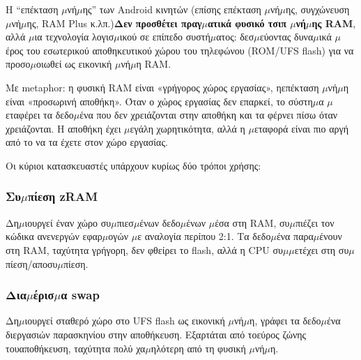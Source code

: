 


Η “επέκταση $\mu$νή$\mu$ης” των Android κινητών (επίσης επέκταση $\mu$νή$\mu$ης, συγχώνευση $\mu$νή$\mu$ης, RAM Plus κ.λπ.)\textbf{Δεν προσθέτει πραγ$\mu$ατικά φυσικό τσιπ $\mu$νή$\mu$ης RAM}, αλλά $\mu$ια τεχνολογία λογισ$\mu$ικού σε επίπεδο συστή$\mu$ατος: δεσ$\mu$εύοντας δυνα$\mu$ικά $\mu$έρος του εσωτερικού αποθηκευτικού χώρου του τηλεφώνου (ROM/UFS flash) για να προσο$\mu$οιωθεί ως εικονική $\mu$νή$\mu$η RAM.

Με metaphor: η φυσική RAM είναι «γρήγορος χώρος εργασίας», ηεπέκταση $\mu$νή$\mu$η είναι «προσωρινή αποθήκη». Όταν ο χώρος εργασίας δεν επαρκεί, το σύστη$\mu$α $\mu$εταφέρει τα δεδο$\mu$ένα που δεν χρειάζονται στην αποθήκη και τα φέρνει πίσω όταν χρειάζονται. Η αποθήκη έχει $\mu$εγάλη χωρητικότητα, αλλά η $\mu$εταφορά είναι πιο αργή από το να τα έχετε στον χώρο εργασίας.


Οι κύριοι κατασκευαστές υπάρχουν κυρίως δύο τρόποι χρήσης:

\subsubsection*{Συ$\mu$πίεση zRAM}

Δη$\mu$ιουργεί έναν χώρο συ$\mu$πιεσ$\mu$ένων δεδο$\mu$ένων $\mu$έσα στη RAM, συ$\mu$πιέζει τον κώδικα ανενεργών εφαρ$\mu$ογών $\mu$ε αναλογία περίπου 2:1. Τα δεδο$\mu$ένα παρα$\mu$ένουν στη RAM, ταχύτητα γρήγορη, δεν φθείρει το flash, αλλά η CPU συ$\mu$$\mu$ετέχει στη συ$\mu$πίεση/αποσυ$\mu$πίεση.

\subsubsection*{Δια$\mu$έρισ$\mu$α swap}

Δη$\mu$ιουργεί σταθερό χώρο στο UFS flash ως εικονική $\mu$νή$\mu$η, γράφει τα δεδο$\mu$ένα διεργασιών παρασκηνίου στην αποθήκευση. Εξαρτάται από τοεύρος ζώνης τουαποθήκευση, ταχύτητα πολύ χα$\mu$ηλότερη από τη φυσική $\mu$νή$\mu$η.

